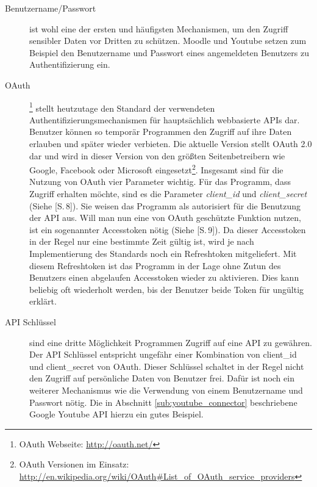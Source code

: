 \begin{description}
    \item[Benutzername/Passwort] ist wohl eine der ersten und häufigsten Mechanismen, um den Zugriff sensibler Daten vor Dritten zu schützen. Moodle und Youtube setzen zum Beispiel den Benutzername und Passwort eines angemeldeten Benutzers zu Authentifizierung ein.
    
    \item[OAuth]\footnote{OAuth Webseite: \url{http://oauth.net/}} stellt heutzutage den Standard der verwendeten Authentifizierungsmechanismen für hauptsächlich webbasierte APIs dar. Benutzer können so temporär Programmen den Zugriff auf ihre Daten erlauben und später wieder verbieten. Die aktuelle Version stellt OAuth 2.0 dar und wird in dieser Version von den größten Seitenbetreibern wie Google, Facebook oder Microsoft eingesetzt\footnote{OAuth Versionen im Einsatz: \url{http://en.wikipedia.org/wiki/OAuth\#List\_of\_OAuth\_service\_providers}}. Insgesamt sind für die Nutzung von OAuth vier Parameter wichtig. Für das Programm, dass Zugriff erhalten möchte, sind es die Parameter \emph{client\_id} und \emph{client\_secret} (Siehe \cite{rfc6749}[S.\,8]). Sie weisen das Programm als autorisiert für die Benutzung der API aus. Will man nun eine von OAuth geschützte Funktion nutzen, ist ein sogenannter Accesstoken nötig (Siehe \cite{rfc6749}[S.\,9]). Da dieser Accesstoken in der Regel nur eine bestimmte Zeit gültig ist, wird je nach Implementierung des Standards noch ein Refreshtoken mitgeliefert. Mit diesem Refreshtoken ist das Programm in der Lage ohne Zutun des Benutzers einen abgelaufen Accesstoken wieder zu aktivieren. Dies kann beliebig oft wiederholt werden, bis der Benutzer beide Token für ungültig erklärt.
    
    \item[API Schlüssel] sind eine dritte Möglichkeit Programmen Zugriff auf eine API zu gewähren. Der API Schlüssel entspricht ungefähr einer Kombination von client\_id und client\_secret von OAuth. Dieser Schlüssel schaltet in der Regel nicht den Zugriff auf persönliche Daten von Benutzer frei. Dafür ist noch ein weiterer Mechanismus wie die Verwendung von einem Benutzername und Passwort nötig. Die in Abschnitt \ref{sub:youtube_connector}  beschriebene Google Youtube API hierzu ein gutes Beispiel.
\end{description}

